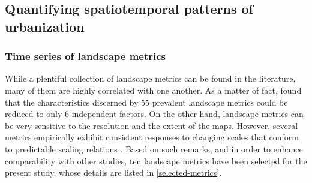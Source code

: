 




\subsection*{Quantifying spatiotemporal patterns of urbanization}

\subsubsection*{Time series of landscape metrics}

While a plentiful collection of landscape metrics can be found in the literature, many of them are highly correlated with one another. As a matter of fact, \cite{riitters1995factor} found that the characteristics discerned by 55 prevalent landscape metrics could be reduced to only 6 independent factors.
On the other hand, landscape metrics can be very sensitive to the resolution and the extent of the maps. However, several metrics empirically exhibit consistent responses to changing scales that conform to predictable scaling relations \citep{wu2002empirical, wu2004effects}.
Based on such remarks, and in order to enhance comparability with other studies, ten landscape metrics have been selected for the present study, whose details are listed in \autoref{selected-metrics}.

